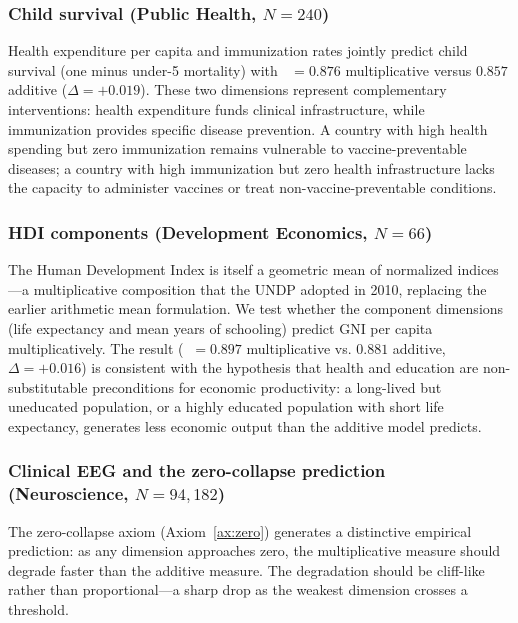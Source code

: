 \documentclass[12pt, a4paper]{article}
\theoremstyle{definition}
\theoremstyle{remark}
\DeclareMathOperator{\Spearman}{\rho_s}
\begin{document}
\subsubsection{Child survival (Public Health, $N = 240$)}

Health expenditure per capita and immunization rates jointly predict child survival (one minus under-5 mortality) with $\Spearman = 0.876$ multiplicative versus $0.857$ additive ($\Delta = +0.019$). These two dimensions represent complementary interventions: health expenditure funds clinical infrastructure, while immunization provides specific disease prevention. A country with high health spending but zero immunization remains vulnerable to vaccine-preventable diseases; a country with high immunization but zero health infrastructure lacks the capacity to administer vaccines or treat non-vaccine-preventable conditions.

\subsubsection{HDI components (Development Economics, $N = 66$)}

The Human Development Index is itself a geometric mean of normalized indices---a multiplicative composition that the UNDP adopted in 2010, replacing the earlier arithmetic mean formulation. We test whether the component dimensions (life expectancy and mean years of schooling) predict GNI per capita multiplicatively. The result ($\Spearman = 0.897$ multiplicative vs. $0.881$ additive, $\Delta = +0.016$) is consistent with the hypothesis that health and education are non-substitutable preconditions for economic productivity: a long-lived but uneducated population, or a highly educated population with short life expectancy, generates less economic output than the additive model predicts.

\subsubsection{Clinical EEG and the zero-collapse prediction (Neuroscience, $N = 94{,}182$)}\label{sec:eeg}

The zero-collapse axiom (Axiom~\ref{ax:zero}) generates a distinctive empirical prediction: as any dimension approaches zero, the multiplicative measure should degrade faster than the additive measure. The degradation should be cliff-like rather than proportional---a sharp drop as the weakest dimension crosses a threshold.
\end{document}
